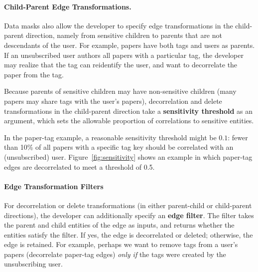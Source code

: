 \paragraph{Child-Parent Edge Transformations.}
Data masks also allow the developer to specify edge transformations in the child-parent direction,
namely from sensitive children to parents that are not descendants of the user. 
%
For example, papers have both tags and users as parents. If an unsubscribed user authors all papers
with a particular tag, the developer may realize that the tag can reidentify the user, and want to
decorrelate the paper from the tag.

Because parents of sensitive children may have non-sensitive children (\eg many papers may share
tags with the user's papers), decorrelation and delete transformations in the child-parent direction 
take a \textbf{sensitivity threshold} as an argument, which sets the allowable
proportion of correlations to sensitive entities. 

In the paper-tag example, a reasonable sensitivity threshold
might be $0.1$: fewer than 10\% of all papers with a specific tag key should be correlated with an
(unsubscribed) user.  Figure~\ref{fig:sensitivity} shows an example in which paper-tag edges are
decorrelated to meet a threshold of 0.5.

\paragraph{Edge Transformation Filters}
For decorrelation or delete transformations (in either parent-child or child-parent directions), the
developer can additionally specify an \textbf{edge filter}. The filter takes the parent and child
entities of the edge as inputs, and returns whether the entities satisfy the filter. If yes, the
edge is decorrelated or deleted; otherwise, the edge is retained. 
%
For example, perhaps we want to remove tags from a user's papers (decorrelate paper-tag edges)
\emph{only if} the tags were created by the unsubscribing user.

